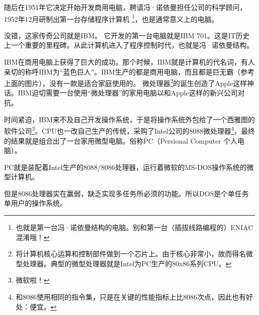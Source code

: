 \documentclass[amstex,twoside]{ctexbook}
\begin{document}

随后在1951年它决定开始开发商用电脑，聘请冯·诺依曼担任公司的科学顾问，1952年12月研制出第一台存储程序计算机
\footnote{也就是第一台冯·诺依曼结构的电脑。别和第一台（插拔线路编程的）ENIAC混淆哦！}，也是通常意义上的电脑。

没错，这家传奇公司就是IBM。
它开发的第一台电脑就是IBM 701。这是IT历史上一个重要的里程碑。从此计算机进入了程序控制时代，也就是冯·诺依曼结构。

IBM在商用电脑上获得了巨大的成功。那个时候，IBM就是计算机的代名词，有人亲切的称呼IBM为“蓝色巨人”。IBM生产的都是商用电脑，而且都是巨无霸（参考上面的图片），没有一款是适合家庭使用的。
微处理器\footnote{将计算机核心运算和控制部件做到一个芯片上。由于核心非常小，故而得名微型处理器。典型的微型处理器就是Intel为PC生产的80x86系列CPU。}的诞生创造了Apple这样神话。IBM迫切需要一台使用“微处理器”的家用电脑以和Apple这样的新兴公司对抗。

时间紧迫，IBM来不及自己开发操作系统，于是将操作系统外包给了一个西雅图的软件公司\footnote{微软啦！}。CPU也一改自己生产的传统，采购了Intel公司的8088微处理器\footnote{和8086使用相同的指令集，只是在关键的性能指标上比8086次点，因此也有好处：便宜。}，最终的结果就是组合出了一台家用微型电脑。俗称PC（Persional Computer 个人电脑）。

PC就是装配着Intel生产的8088/8086处理器，运行着微软的MS-DOS操作系统的微型计算机。

但是8086处理器实在赢弱，缺乏实现多任务所必须的功能。所以DOS是个单任务单用户的操作系统。
\end{document}
